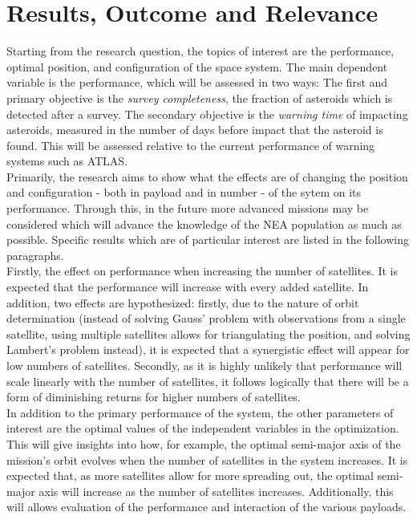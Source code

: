 \documentclass[12pt, english, NoHyper]{AE4010-template}
\begin{document}
\section{Results, Outcome and Relevance}
Starting from the research question, the topics of interest are the performance, optimal position, and configuration of the space system. The main dependent variable is the performance, which will be assessed in two ways: The first and primary objective is the \textit{survey completeness}, the fraction of asteroids which is detected after a survey. The secondary objective is the \textit{warning time} of impacting asteroids, measured in the number of days before impact that the asteroid is found. This will be assessed relative to the current performance of warning systems such as ATLAS. \\

Primarily, the research aims to show what the effects are of changing the position and configuration - both in payload and in number - of the sytem on its performance. Through this, in the future more advanced missions may be considered which will advance the knowledge of the NEA population as much as possible. Specific results which are of particular interest are listed in the following paragraphs. \\

Firstly, the effect on performance when increasing the number of satellites. It is expected that the performance will increase with every added satellite. In addition, two effects are hypothesized: firstly, due to the nature of orbit determination (instead of solving Gauss' problem with observations from a single satellite, using multiple satellites allows for triangulating the position, and solving Lambert's problem instead), it is expected that a synergistic effect will appear for low numbers of satellites. Secondly, as it is highly unlikely that performance will scale linearly with the number of satellites, it follows logically that there will be a form of diminishing returns for higher numbers of satellites. \\

In addition to the primary performance of the system, the other parameters of interest are the optimal values of the independent variables in the optimization. This will give insights into how, for example, the optimal semi-major axis of the mission's orbit evolves when the number of satellites in the system increases. It is expected that, as more satellites allow for more spreading out, the optimal semi-major axis will increase as the number of satellites increases. Additionally, this will allows evaluation of the performance and interaction of the various payloads. \\
\end{document}
